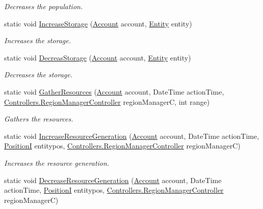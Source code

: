 \begin{DoxyCompactItemize}
\begin{DoxyCompactList}\small\item\em Decreases the population. \end{DoxyCompactList}\item 
static void \hyperlink{classCore_1_1Models_1_1LogicRules_ae7859acf93d2dd6153b1d7490a76bec6}{Increase\+Storage} (\hyperlink{classCore_1_1Models_1_1Account}{Account} account, \hyperlink{classCore_1_1Models_1_1Entity}{Entity} entity)
\begin{DoxyCompactList}\small\item\em Increases the storage. \end{DoxyCompactList}\item 
static void \hyperlink{classCore_1_1Models_1_1LogicRules_a61386300d32614e241e31457ef2395ef}{Decreas\+Storage} (\hyperlink{classCore_1_1Models_1_1Account}{Account} account, \hyperlink{classCore_1_1Models_1_1Entity}{Entity} entity)
\begin{DoxyCompactList}\small\item\em Decreases the storage. \end{DoxyCompactList}\item 
static void \hyperlink{classCore_1_1Models_1_1LogicRules_ab775894692c4712e0e1920380ee9de07}{Gather\+Resources} (\hyperlink{classCore_1_1Models_1_1Account}{Account} account, Date\+Time action\+Time, \hyperlink{classCore_1_1Controllers_1_1RegionManagerController}{Controllers.\+Region\+Manager\+Controller} region\+Manager\+C, int range)
\begin{DoxyCompactList}\small\item\em Gathers the resources. \end{DoxyCompactList}\item 
static void \hyperlink{classCore_1_1Models_1_1LogicRules_a8108a7426fbef7689f4b3cec1492e6cb}{Increase\+Resource\+Generation} (\hyperlink{classCore_1_1Models_1_1Account}{Account} account, Date\+Time action\+Time, \hyperlink{classCore_1_1Models_1_1PositionI}{Position\+I} entitypos, \hyperlink{classCore_1_1Controllers_1_1RegionManagerController}{Controllers.\+Region\+Manager\+Controller} region\+Manager\+C)
\begin{DoxyCompactList}\small\item\em Increases the resource generation. \end{DoxyCompactList}\item 
static void \hyperlink{classCore_1_1Models_1_1LogicRules_afdd4a1980e815cee411b0cf5fff0427d}{Decrease\+Resource\+Generation} (\hyperlink{classCore_1_1Models_1_1Account}{Account} account, Date\+Time action\+Time, \hyperlink{classCore_1_1Models_1_1PositionI}{Position\+I} entitypos, \hyperlink{classCore_1_1Controllers_1_1RegionManagerController}{Controllers.\+Region\+Manager\+Controller} region\+Manager\+C)

\end{DoxyCompactItemize}
